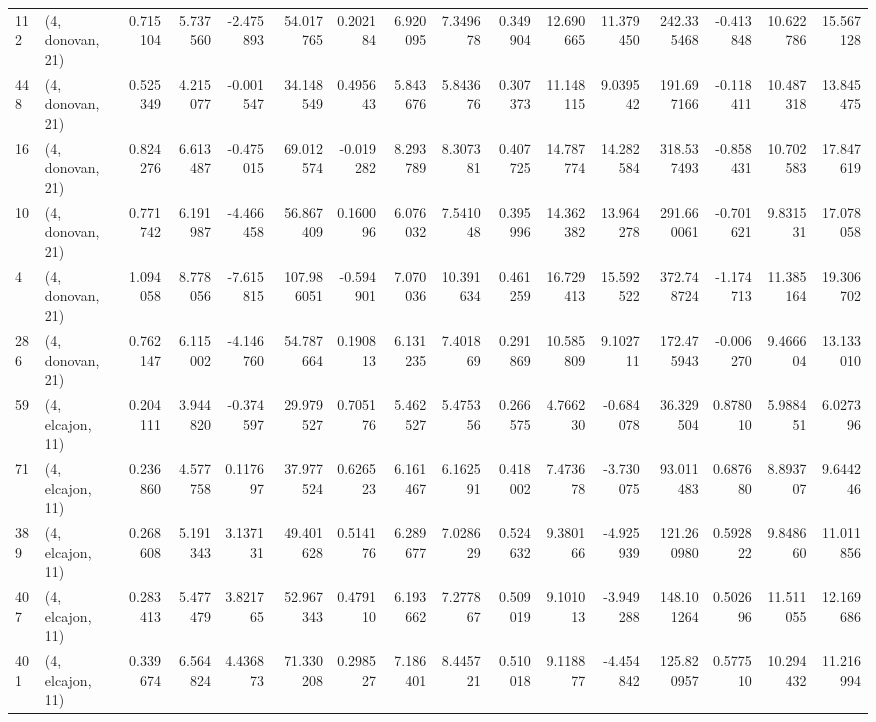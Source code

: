 \begin{tabular}{llrrrrrrrrrrrrrr}
112 &  (4, donovan, 21) &   0.715104 &   5.737560 &  -2.475893 &    54.017765 &   0.202184 &   6.920095 &   7.349678 &  0.349904 &  12.690665 &  11.379450 &   242.335468 &  -0.413848 &  10.622786 &  15.567128 \\
448 &  (4, donovan, 21) &   0.525349 &   4.215077 &  -0.001547 &    34.148549 &   0.495643 &   5.843676 &   5.843676 &  0.307373 &  11.148115 &   9.039542 &   191.697166 &  -0.118411 &  10.487318 &  13.845475 \\
16  &  (4, donovan, 21) &   0.824276 &   6.613487 &  -0.475015 &    69.012574 &  -0.019282 &   8.293789 &   8.307381 &  0.407725 &  14.787774 &  14.282584 &   318.537493 &  -0.858431 &  10.702583 &  17.847619 \\
10  &  (4, donovan, 21) &   0.771742 &   6.191987 &  -4.466458 &    56.867409 &   0.160096 &   6.076032 &   7.541048 &  0.395996 &  14.362382 &  13.964278 &   291.660061 &  -0.701621 &   9.831531 &  17.078058 \\
4   &  (4, donovan, 21) &   1.094058 &   8.778056 &  -7.615815 &   107.986051 &  -0.594901 &   7.070036 &  10.391634 &  0.461259 &  16.729413 &  15.592522 &   372.748724 &  -1.174713 &  11.385164 &  19.306702 \\
286 &  (4, donovan, 21) &   0.762147 &   6.115002 &  -4.146760 &    54.787664 &   0.190813 &   6.131235 &   7.401869 &  0.291869 &  10.585809 &   9.102711 &   172.475943 &  -0.006270 &   9.466604 &  13.133010 \\
59  &  (4, elcajon, 11) &   0.204111 &   3.944820 &  -0.374597 &    29.979527 &   0.705176 &   5.462527 &   5.475356 &  0.266575 &   4.766230 &  -0.684078 &    36.329504 &   0.878010 &   5.988451 &   6.027396 \\
71  &  (4, elcajon, 11) &   0.236860 &   4.577758 &   0.117697 &    37.977524 &   0.626523 &   6.161467 &   6.162591 &  0.418002 &   7.473678 &  -3.730075 &    93.011483 &   0.687680 &   8.893707 &   9.644246 \\
389 &  (4, elcajon, 11) &   0.268608 &   5.191343 &   3.137131 &    49.401628 &   0.514176 &   6.289677 &   7.028629 &  0.524632 &   9.380166 &  -4.925939 &   121.260980 &   0.592822 &   9.848660 &  11.011856 \\
407 &  (4, elcajon, 11) &   0.283413 &   5.477479 &   3.821765 &    52.967343 &   0.479110 &   6.193662 &   7.277867 &  0.509019 &   9.101013 &  -3.949288 &   148.101264 &   0.502696 &  11.511055 &  12.169686 \\
401 &  (4, elcajon, 11) &   0.339674 &   6.564824 &   4.436873 &    71.330208 &   0.298527 &   7.186401 &   8.445721 &  0.510018 &   9.118877 &  -4.454842 &   125.820957 &   0.577510 &  10.294432 &  11.216994 \\

\end{tabular}
